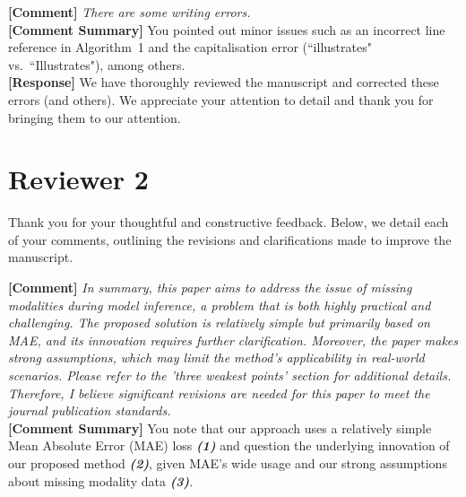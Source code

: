 \documentclass{article}
\begin{document}
\vspace{0.25cm}
\hline
\vspace{0.25cm}

\noindent\textbf{[Comment]} \textit{There are some writing errors.}
\\

\noindent\textbf{[Comment Summary]} You pointed out minor issues such as an incorrect line reference in Algorithm~1 and the capitalisation error (``illustrates" vs.\ ``Illustrates"), among others.
\\

\noindent\textbf{[Response]} We have thoroughly reviewed the manuscript and corrected these errors (and others). We appreciate your attention to detail and thank you for bringing them to our attention.

\vspace{0.25cm}
\hline

\section*{Reviewer 2}
Thank you for your thoughtful and constructive feedback. Below, we detail each of your comments, outlining the revisions and clarifications made to improve the manuscript.

\vspace{0.25cm}
\hline
\vspace{0.25cm}

\noindent\textbf{[Comment]} \textit{In summary, this paper aims to address the issue of missing modalities during model inference, a problem that is both highly
practical and challenging. The proposed solution is relatively simple but primarily based on MAE, and its innovation requires further clarification. Moreover, the paper makes strong assumptions, which may limit the method's applicability in real-world scenarios. Please refer to the 'three weakest points' section for additional details. Therefore, I believe significant revisions are needed for this paper to meet the journal publication standards.}
\\

\noindent\textbf{[Comment Summary]} You note that our approach uses a relatively simple Mean Absolute Error (MAE) loss \textbf{\textit{(1)}} and question the underlying innovation of our proposed method \textbf{\textit{(2)}}, given MAE's wide usage and our strong assumptions about missing modality data \textbf{\textit{(3)}}.
\\
\end{document}
